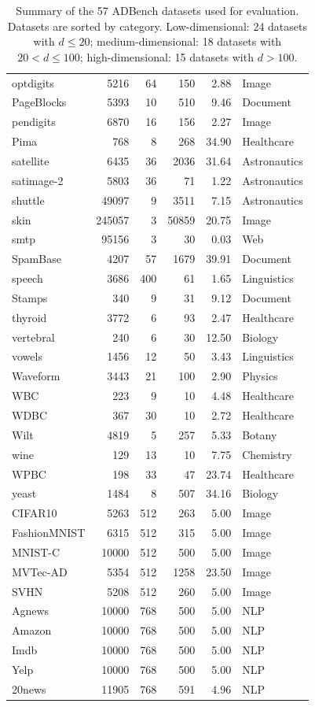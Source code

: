 \documentclass[conference]{IEEEtran}
\begin{document}
\begin{table}[htbp]
{\begin{tabular}{lrrrrl}
				optdigits & 5216 & 64 & 150 & 2.88 & Image \\
				PageBlocks & 5393 & 10 & 510 & 9.46 & Document \\
				pendigits & 6870 & 16 & 156 & 2.27 & Image \\
				Pima & 768 & 8 & 268 & 34.90 & Healthcare \\
				satellite & 6435 & 36 & 2036 & 31.64 & Astronautics \\
				satimage-2 & 5803 & 36 & 71 & 1.22 & Astronautics \\
				shuttle & 49097 & 9 & 3511 & 7.15 & Astronautics \\
				skin & 245057 & 3 & 50859 & 20.75 & Image \\
				smtp & 95156 & 3 & 30 & 0.03 & Web \\
				SpamBase & 4207 & 57 & 1679 & 39.91 & Document \\
				speech & 3686 & 400 & 61 & 1.65 & Linguistics \\
				Stamps & 340 & 9 & 31 & 9.12 & Document \\
				thyroid & 3772 & 6 & 93 & 2.47 & Healthcare \\
				vertebral & 240 & 6 & 30 & 12.50 & Biology \\
				vowels & 1456 & 12 & 50 & 3.43 & Linguistics \\
				Waveform & 3443 & 21 & 100 & 2.90 & Physics \\
				WBC & 223 & 9 & 10 & 4.48 & Healthcare \\
				WDBC & 367 & 30 & 10 & 2.72 & Healthcare \\
				Wilt & 4819 & 5 & 257 & 5.33 & Botany \\
				wine & 129 & 13 & 10 & 7.75 & Chemistry \\
				WPBC & 198 & 33 & 47 & 23.74 & Healthcare \\
				yeast & 1484 & 8 & 507 & 34.16 & Biology \\
				CIFAR10 & 5263 & 512 & 263 & 5.00 & Image \\
				FashionMNIST & 6315 & 512 & 315 & 5.00 & Image \\
				MNIST-C & 10000 & 512 & 500 & 5.00 & Image \\
				MVTec-AD & 5354 & 512 & 1258 & 23.50 & Image \\
				SVHN & 5208 & 512 & 260 & 5.00 & Image \\
				Agnews & 10000 & 768 & 500 & 5.00 & NLP \\
				Amazon & 10000 & 768 & 500 & 5.00 & NLP \\
				Imdb & 10000 & 768 & 500 & 5.00 & NLP \\
				Yelp & 10000 & 768 & 500 & 5.00 & NLP \\
				20news & 11905 & 768 & 591 & 4.96 & NLP \\
				\bottomrule
			\end{tabular}
		}
		\caption{Summary of the 57 ADBench datasets used for evaluation. Datasets are sorted by category. Low-dimensional: 24 datasets with $d \leq 20$; medium-dimensional: 18 datasets with $20 < d \leq 100$; high-dimensional: 15 datasets with $d > 100$.}
		\label{tab:datasets}
	\end{table}
\end{document}
